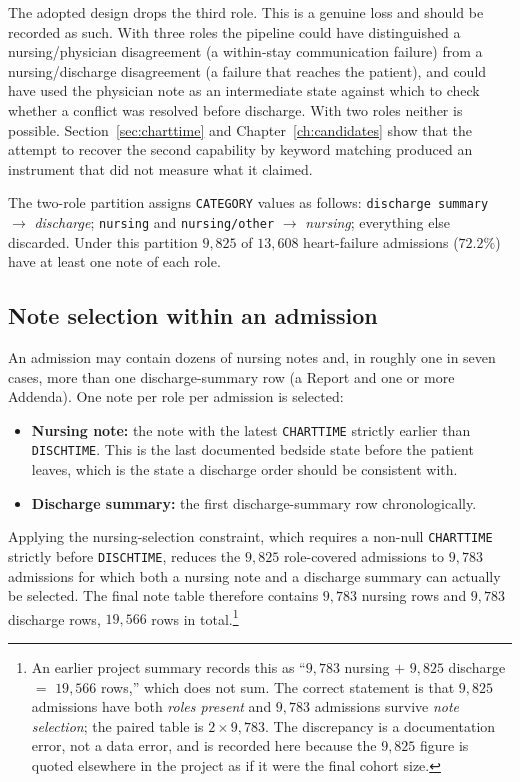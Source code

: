 The adopted design drops the third role. This is a genuine loss and should be
recorded as such. With three roles the pipeline could have distinguished a
nursing/physician disagreement (a within-stay communication failure) from a
nursing/discharge disagreement (a failure that reaches the patient), and could
have used the physician note as an intermediate state against which to check
whether a conflict was resolved before discharge. With two roles neither is
possible. Section~\ref{sec:charttime} and Chapter~\ref{ch:candidates} show that
the attempt to recover the second capability by keyword matching produced an
instrument that did not measure what it claimed.

The two-role partition assigns \texttt{CATEGORY} values as follows:
\texttt{discharge summary} $\rightarrow$ \emph{discharge}; \texttt{nursing} and
\texttt{nursing/other} $\rightarrow$ \emph{nursing}; everything else discarded.
Under this partition $9{,}825$ of $13{,}608$ heart-failure admissions
($72.2\%$) have at least one note of each role.

\subsection{Note selection within an admission}

An admission may contain dozens of nursing notes and, in roughly one in seven
cases, more than one discharge-summary row (a Report and one or more Addenda).
One note per role per admission is selected:

\begin{itemize}
\item \textbf{Nursing note:} the note with the latest \texttt{CHARTTIME}
      strictly earlier than \texttt{DISCHTIME}. This is the last documented
      bedside state before the patient leaves, which is the state a discharge
      order should be consistent with.
\item \textbf{Discharge summary:} the first discharge-summary row
      chronologically.
\end{itemize}

Applying the nursing-selection constraint, which requires a non-null
\texttt{CHARTTIME} strictly before \texttt{DISCHTIME}, reduces the $9{,}825$
role-covered admissions to $9{,}783$ admissions for which both a nursing note
and a discharge summary can actually be selected. The final note table therefore
contains $9{,}783$ nursing rows and $9{,}783$ discharge rows, $19{,}566$ rows in
total.\footnote{An earlier project summary records this as ``$9{,}783$ nursing
$+$ $9{,}825$ discharge $=$ $19{,}566$ rows,'' which does not sum. The correct
statement is that $9{,}825$ admissions have both \emph{roles present} and
$9{,}783$ admissions survive \emph{note selection}; the paired table is
$2 \times 9{,}783$. The discrepancy is a documentation error, not a data error,
and is recorded here because the $9{,}825$ figure is quoted elsewhere in the
project as if it were the final cohort size.}

